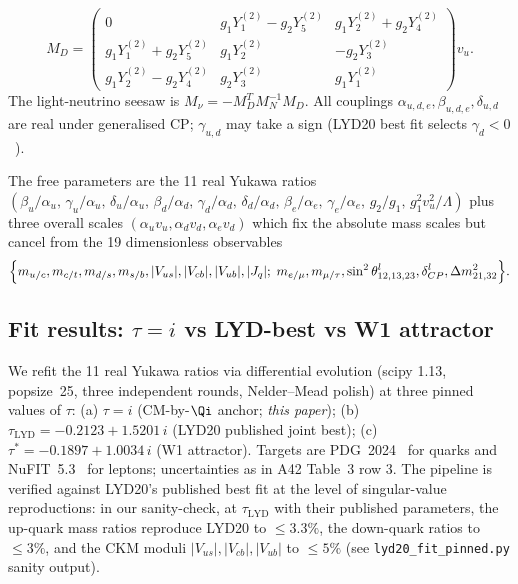 \begin{equation}
\label{eq:v75_MD}
M_{D}=\begin{pmatrix}
0 & g_{1} Y_{1}^{(2)}-g_{2} Y_{5}^{(2)} & g_{1} Y_{2}^{(2)}+g_{2} Y_{4}^{(2)}\\
g_{1} Y_{1}^{(2)}+g_{2} Y_{5}^{(2)} & g_{1} Y_{2}^{(2)} & -g_{2} Y_{3}^{(2)} \\
g_{1} Y_{2}^{(2)}-g_{2} Y_{4}^{(2)} & g_{2} Y_{3}^{(2)} & g_{1} Y_{1}^{(2)}
\end{pmatrix}v_{u}.
\end{equation}
The light-neutrino seesaw is $M_{\nu}=-M_{D}^{T}M_{N}^{-1}M_{D}$.
All couplings $\alpha_{u,d,e},\beta_{u,d,e},\delta_{u,d}$ are real
under generalised CP; $\gamma_{u,d}$ may take a sign
(LYD20 best fit selects $\gamma_{d}<0$~\cite[Eq.~(2.30)]{LYD20}).

The free parameters are the 11 real Yukawa ratios
$(\beta_{u}/\alpha_{u},\,\gamma_{u}/\alpha_{u},\,\delta_{u}/\alpha_{u},\,
  \beta_{d}/\alpha_{d},\,\gamma_{d}/\alpha_{d},\,\delta_{d}/\alpha_{d},\,
  \beta_{e}/\alpha_{e},\,\gamma_{e}/\alpha_{e},\,g_{2}/g_{1},\,
  g_{1}^{2}v_{u}^{2}/\Lambda)$ plus three overall scales
$(\alpha_{u}v_{u},\alpha_{d}v_{d},\alpha_{e}v_{d})$ which fix the
absolute mass scales but cancel from the 19 dimensionless observables
\begin{equation}
\label{eq:v75_obs}
\Bigl\{m_{u/c},m_{c/t},m_{d/s},m_{s/b},|V_{us}|,|V_{cb}|,|V_{ub}|,|J_{q}|;\;
        m_{e/\mu},m_{\mu/\tau},\sin^{2}\theta_{12,13,23}^{l},
        \delta_{CP}^{l},\Delta m_{21,32}^{2}\Bigr\}.
\end{equation}

\subsection{Fit results: $\tau=i$ vs LYD-best vs W1 attractor}
\label{sec:v75_fit}

We refit the 11 real Yukawa ratios via differential evolution
(scipy 1.13, popsize~25, three independent rounds, Nelder--Mead polish)
at three pinned values of $\tau$: (a) $\tau=i$ (CM-by-$\Qi$ anchor;
\emph{this paper}); (b) $\tau_{\text{LYD}}=-0.2123+1.5201\,i$ (LYD20
\cite{LYD20} published joint best); (c) $\tau^{*}=-0.1897+1.0034\,i$
(W1 attractor).  Targets are PDG~2024~\cite{PDG2024} for quarks and
NuFIT~5.3~\cite{Esteban2024} for leptons; uncertainties as in
A42 Table~3 row 3.  The pipeline is verified against LYD20's published
best fit at the level of singular-value reproductions: in our
sanity-check, at $\tau_{\text{LYD}}$ with their published parameters,
the up-quark mass ratios reproduce LYD20 to $\le 3.3\%$, the
down-quark ratios to $\le 3\%$, and the CKM moduli
$|V_{us}|,|V_{cb}|,|V_{ub}|$ to $\le 5\%$
(see \texttt{lyd20\_fit\_pinned.py} sanity output).

